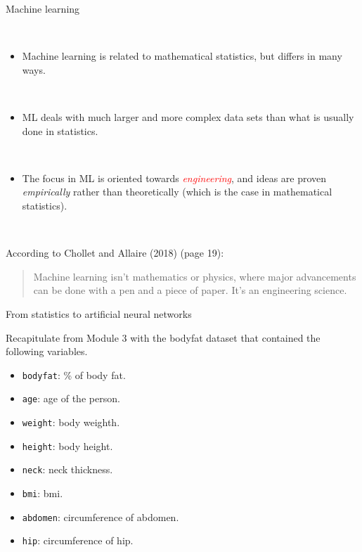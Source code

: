 \documentclass[10pt,ignorenonframetext,]{beamer}
\providecommand{\tightlist}{%
  \setlength{\itemsep}{0pt}\setlength{\parskip}{0pt}}
\begin{document}
\begin{frame}

\begin{block}{Machine learning}

\(~\)

\begin{itemize}
\tightlist
\item
  Machine learning is related to mathematical statistics, but differs in
  many ways.
\end{itemize}

\(~\)

\begin{itemize}
\tightlist
\item
  ML deals with much larger and more complex data sets than what is
  usually done in statistics.
\end{itemize}

\(~\)

\begin{itemize}
\tightlist
\item
  The focus in ML is oriented towards
  \emph{\textcolor{red}{engineering}}, and ideas are proven
  \emph{empirically} rather than theoretically (which is the case in
  mathematical statistics).
\end{itemize}

\(~\)

According to Chollet and Allaire (2018) (page 19): \vspace{2mm}

\begin{quote}
Machine learning isn't mathematics or physics, where major advancements can be done with a pen and a piece of paper. It's an engineering science.
\end{quote}

\end{block}

\end{frame}

\begin{frame}[fragile]{From statistics to artificial neural networks}
\protect\hypertarget{from-statistics-to-artificial-neural-networks}{}

Recapitulate from Module 3 with the bodyfat dataset that contained the
following variables.

\begin{itemize}
\tightlist
\item
  \texttt{bodyfat}: \% of body fat.
\item
  \texttt{age}: age of the person.
\item
  \texttt{weight}: body weighth.
\item
  \texttt{height}: body height.
\item
  \texttt{neck}: neck thickness.
\item
  \texttt{bmi}: bmi.
\item
  \texttt{abdomen}: circumference of abdomen.
\item
  \texttt{hip}: circumference of hip.
\end{itemize}

\end{frame}
\end{document}
